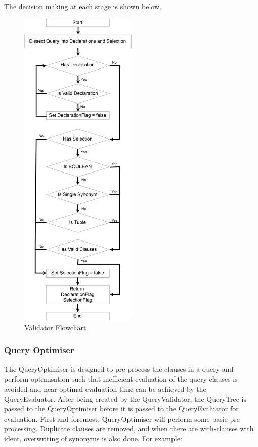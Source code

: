 \documentclass[12pt]{article}
\begin{document}
{{{{{{{{{{{{{The decision making at each stage is shown below.
\begin{figure}[H]
  \centering 
  \caption{Validator Flowchart}
 \includegraphics[width=0.5\textwidth]{QV_Flowchart.png}
\end{figure}
\subsubsection{Query Optimiser}
The QueryOptimiser is designed to pre-process the clauses in a query and perform optimisation such that inefficient evaluation of the query clauses is avoided and near optimal evaluation time can be achieved by the QueryEvaluator. After being created by the QueryValidator, the QueryTree is passed to the QueryOptimiser before it is passed to the QueryEvaluator for evaluation.
\newline
First and foremost, QueryOptimiser will perform some basic pre-processing. Duplicate clauses are removed, and when there are with-clauses with ident, overwriting of synonyms is also done.
\newline For example: \newline
\begin{center}
\end{center}}}}}}}}}}}}}}
\end{document}
